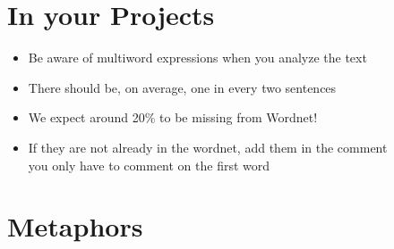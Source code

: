 \documentclass[a4paper,landscape,headrule,footrule,xetex]{foils}
\begin{document}
\section{In your  Projects}

\begin{itemize}
\item Be aware of multiword expressions when you analyze the text
\item There should be, on average, one in every two sentences
\item We expect around 20\% to be missing from Wordnet!  
\item If they are not already in the wordnet, add them in the comment
  \\ you only have to comment on the first word
\end{itemize}








\section{Metaphors}
\end{document}
